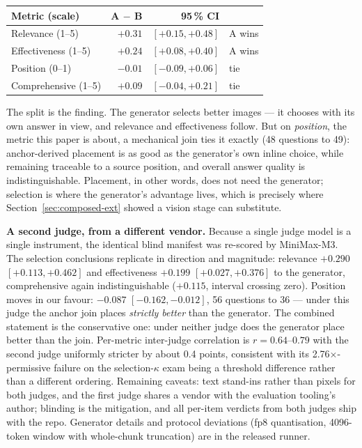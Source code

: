 \documentclass[journal]{IEEEtran}
\begin{document}
\begin{center}
\begin{tabular}{@{}lrrl@{}}
\toprule
Metric (scale) & A $-$ B & 95\,\% CI & \\
\midrule
Relevance (1--5) & $+0.31$ & $[+0.15, +0.48]$ & A wins \\
Effectiveness (1--5) & $+0.24$ & $[+0.08, +0.40]$ & A wins \\
Position (0--1) & $-0.01$ & $[-0.09, +0.06]$ & tie \\
Comprehensive (1--5) & $+0.09$ & $[-0.04, +0.21]$ & tie \\
\bottomrule
\end{tabular}
\end{center}

The split is the finding. The generator selects better images --- it chooses
with its own answer in view, and relevance and effectiveness follow. But on
\emph{position}, the metric this paper is about, a mechanical join ties it
exactly (48 questions to 49): anchor-derived placement is as good as the
generator's own inline choice, while remaining traceable to a source
position, and overall answer quality is indistinguishable. Placement, in
other words, does not need the generator; selection is where the generator's
advantage lives, which is precisely where Section~\ref{sec:composed-ext}
showed a vision stage can substitute.

\textbf{A second judge, from a different vendor.} Because a single judge
model is a single instrument, the identical blind manifest was re-scored by
MiniMax-M3. The selection conclusions replicate in direction and magnitude:
relevance $+0.290$ $[+0.113, +0.462]$ and effectiveness $+0.199$
$[+0.027, +0.376]$ to the generator, comprehensive again indistinguishable
($+0.115$, interval crossing zero). Position moves in our favour: $-0.087$
$[-0.162, -0.012]$, 56 questions to 36 --- under this judge the anchor join
places \emph{strictly better} than the generator. The combined statement is
the conservative one: under neither judge does the generator place better
than the join. Per-metric inter-judge correlation is $r = 0.64$--$0.79$ with
the second judge uniformly stricter by about 0.4 points, consistent with its
2.76$\times$-permissive failure on the selection-$\kappa$ exam being a
threshold difference rather than a different ordering. Remaining caveats:
text stand-ins rather than pixels for both judges, and the first judge shares
a vendor with the evaluation tooling's author; blinding is the mitigation,
and all per-item verdicts from both judges ship with the repo. Generator
details and protocol deviations (fp8 quantisation, 4096-token window with
whole-chunk truncation) are in the released runner.
\end{document}
